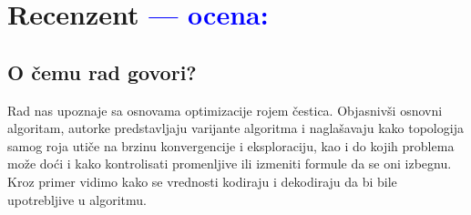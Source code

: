 \documentclass[a4paper]{report}
\newcommand{\odgovor}[1]{\textcolor{blue}{#1}}
\begin{document}
\chapter{Recenzent \odgovor{--- ocena:} }


\section{O čemu rad govori?}
Rad nas upoznaje sa osnovama optimizacije rojem čestica. Objasnivši osnovni algoritam, autorke predstavljaju varijante algoritma i naglašavaju kako topologija samog roja utiče na brzinu konvergencije i eksploraciju, kao i do kojih problema može doći i kako kontrolisati promenljive ili izmeniti formule da se oni izbegnu. Kroz primer vidimo kako se vrednosti kodiraju i dekodiraju da bi bile upotrebljive u algoritmu.
\end{document}
